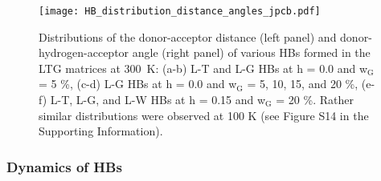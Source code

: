 \documentclass[journal=jpcbfk,manuscript=article]{achemso}
\begin{document}
\begin{singlespacing}
\begin{figure}[htbp]
\texttt{[image: HB\_distribution\_distance\_angles\_jpcb.pdf]}
\caption{\label{hb_dist_ang}
Distributions of the donor-acceptor distance (left panel) and donor-hydrogen-acceptor angle (right panel) of various HBs
formed in the LTG matrices at 300~K: (a-b) L-T and L-G HBs at h = 0.0 and w$_{\textrm{G}}$ = 5 \%, (c-d) L-G HBs at h = 0.0 and 
w$_{\textrm{G}}$ = 5, 10, 15, and 20 \%, (e-f) L-T, L-G, and L-W HBs at h = 0.15 and w$_{\textrm{G}}$ = 20 \%.
Rather similar distributions were observed at 100 K (see Figure S14 in the Supporting Information).
}
\end{figure}


\newpage

\subsubsection{Dynamics of HBs}


\end{singlespacing}
\end{document}
